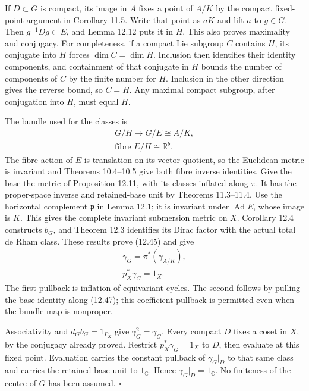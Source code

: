 \documentclass[
  11pt,
]{article}
\begin{document}
If \(D\subset G\) is compact, its image in \(A\) fixes a point of
\(A/K\) by the compact fixed-point argument in Corollary 11.5. Write
that point as \(aK\) and lift \(a\) to \(g\in G\). Then
\(g^{-1}Dg\subset E\), and Lemma 12.12 puts it in \(H\). This also
proves maximality and conjugacy. For completeness, if a compact Lie
subgroup \(C\) contains \(H\), its conjugate into \(H\) forces
\(\dim C=\dim H\). Inclusion then identifies their identity components,
and containment of that conjugate in \(H\) bounds the number of
components of \(C\) by the finite number for \(H\). Inclusion in the
other direction gives the reverse bound, so \(C=H\). Any maximal compact
subgroup, after conjugation into \(H\), must equal \(H\).

The bundle used for the classes is \[
\begin{gathered}
G/H\longrightarrow G/E\cong A/K,\\
\text{fibre }E/H\cong\mathbb R^b.
\end{gathered}
\tag{12.47}
\] The fibre action of \(E\) is translation on its vector quotient, so
the Euclidean metric is invariant and Theorems 10.4--10.5 give both
fibre inverse identities. Give the base the metric of Proposition 12.11,
with its classes inflated along \(\pi\). It has the proper-space inverse
and retained-base unit by Theorems 11.3--11.4. Use the horizontal
complement \(\mathfrak p\) in Lemma 12.1; it is invariant under
\(\operatorname{Ad}E\), whose image is \(K\). This gives the complete
invariant submersion metric on \(X\). Corollary 12.4 constructs \(b_G\),
and Theorem 12.3 identifies its Dirac factor with the actual total de
Rham class. These results prove (12.45) and give \[
\begin{gathered}
\gamma_G=\pi^*(\gamma_{A/K}),\\
p_X^*\gamma_G=1_X.
\end{gathered}
\tag{12.48}
\] The first pullback is inflation of equivariant cycles. The second
follows by pulling the base identity along (12.47); this coefficient
pullback is permitted even when the bundle map is nonproper.

Associativity and \(d_Gb_G=1_{P_X}\) give \(\gamma_G^2=\gamma_G\). Every
compact \(D\) fixes a coset in \(X\), by the conjugacy already proved.
Restrict \(p_X^*\gamma_G=1_X\) to \(D\), then evaluate at this fixed
point. Evaluation carries the constant pullback of \(\gamma_G|_D\) to
that same class and carries the retained-base unit to \(1_{\mathbb C}\).
Hence \(\gamma_G|_D=1_{\mathbb C}\). No finiteness of the centre of
\(G\) has been assumed. \(\square\)
\end{document}
